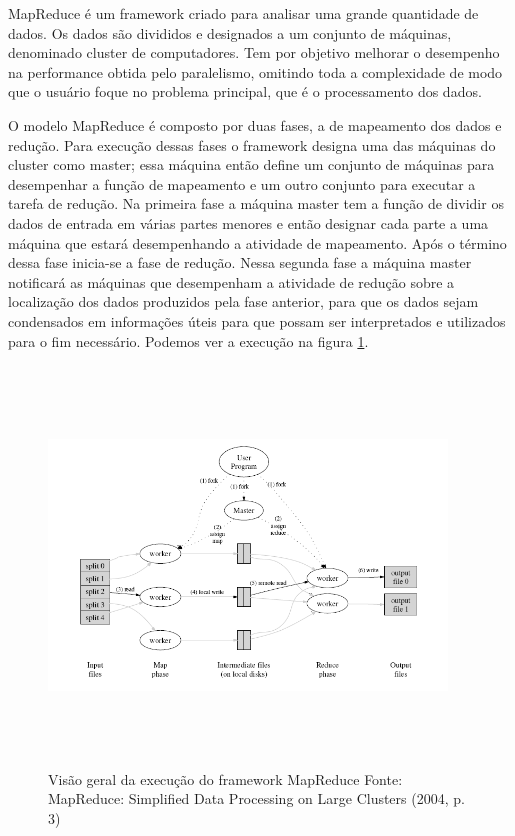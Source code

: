 \documentclass[a4paper,12pt]{article}
\begin{document}
MapReduce é um framework criado para analisar uma grande quantidade de dados. Os
dados são divididos e designados a um conjunto de máquinas, denominado
cluster de computadores. Tem por objetivo melhorar o desempenho na performance
obtida pelo paralelismo, omitindo toda a complexidade de modo que o usuário
foque no problema principal, que é o processamento dos dados.

O modelo MapReduce é composto por duas fases, a de mapeamento dos dados e
redução. Para execução dessas fases o framework designa uma das
máquinas do cluster como master; essa máquina então define um conjunto de
máquinas para desempenhar a função de mapeamento e um outro conjunto para
executar a tarefa de redução. Na primeira fase a máquina master tem a função de
dividir os dados de entrada em várias partes menores e então designar cada parte
a uma máquina que estará desempenhando a atividade de mapeamento. Após o término
dessa fase inicia-se a fase de redução. Nessa segunda fase a máquina master
notificará as máquinas que desempenham a atividade de redução sobre a
localização dos dados produzidos pela fase anterior, para que os dados sejam
condensados em informações úteis para que possam ser interpretados e utilizados
para o fim necessário. Podemos ver a execução na figura \ref{MapReduce}.

\begin{figure}[ht]
  \centering
  \includegraphics[width=400px,height=400px]{img/mapreduce.png}
  \caption{Visão geral da execução do framework MapReduce\newline
  Fonte: MapReduce: Simplified Data Processing on Large Clusters (2004, p. 3)}
  \label{MapReduce}
\end{figure}
\end{document}
